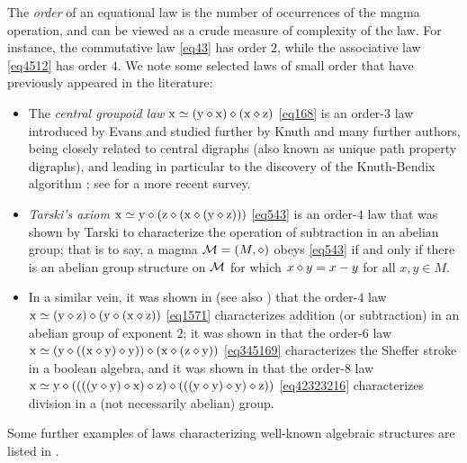 The \emph{order} of an equational law is the number of occurrences of the magma operation, and can be viewed as a crude measure of complexity of the law. For instance, the commutative law \eqref{eq43} has order $2$, while the associative law \eqref{eq4512} has order $4$. We note some selected laws of small order that have previously appeared in the literature:
\begin{itemize}
\item The \emph{central groupoid law} $\mathrm{x} \simeq (\mathrm{y} \diamond \mathrm{x}) \diamond (\mathrm{x} \diamond \mathrm{z})$ \eqref{eq168} is an order-$3$ law introduced by Evans \cite{evans} and studied further by Knuth \cite{knuth} and many further authors, being closely related to central digraphs (also known as unique path property digraphs), and leading in particular to the discovery of the Knuth-Bendix algorithm \cite{knuth-bendix}; see \cite{klt} for a more recent survey.
\item \emph{Tarski's axiom} $\mathrm{x} \simeq \mathrm{y} \diamond (\mathrm{z} \diamond (\mathrm{x} \diamond (\mathrm{y} \diamond \mathrm{z})))$ \eqref{eq543} is an order-$4$ law that was shown by Tarski \cite{Tarski1938} to characterize the operation of subtraction in an abelian group; that is to say, a magma ${\mathcal{M}} = (M,\diamond)$ obeys \eqref{eq543} if and only if there is an abelian group structure on ${\mathcal{M}}$ for which $x \diamond y = x-y$ for all $x,y \in M$.
\item In a similar vein, it was shown in \cite{mendelsohn-padmanabhan} (see also \cite{meredith-prior}) that the order-$4$ law
$\mathrm{x} \simeq (\mathrm{y} \diamond \mathrm{z}) \diamond (\mathrm{y} \diamond (\mathrm{x} \diamond \mathrm{z}))$ \eqref{eq1571} characterizes addition (or subtraction) in an abelian group of exponent $2$; it was shown in \cite{mccune_et_al} that the order-$6$ law $\mathrm{x} \simeq (\mathrm{y} \diamond ((\mathrm{x} \diamond \mathrm{y}) \diamond \mathrm{y})) \diamond (\mathrm{x} \diamond (\mathrm{z} \diamond \mathrm{y}))$ \eqref{eq345169} characterizes the Sheffer stroke in a boolean algebra, and it was shown in \cite{higman-neumann} that the order-$8$ law
$\mathrm{x} \simeq \mathrm{y} \diamond ((((\mathrm{y} \diamond \mathrm{y}) \diamond \mathrm{x}) \diamond \mathrm{z}) \diamond (((\mathrm{y} \diamond \mathrm{y}) \diamond \mathrm{y}) \diamond \mathrm{z}))$ \eqref{eq42323216} characterizes division in a (not necessarily abelian) group.
\end{itemize}
Some further examples of laws characterizing well-known algebraic structures are listed in \cite{mccune-survey}.

